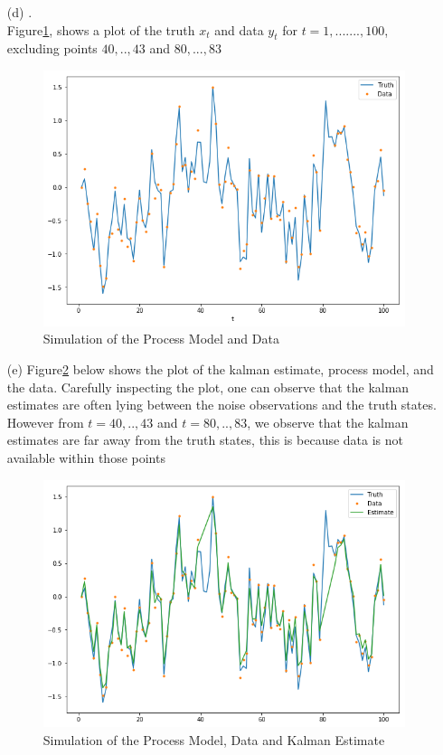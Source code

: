 \documentclass[12pt,a4paper]{article}
\begin{document}
\begin{itemize}
	\item [(d)].\\	
	Figure\ref{fig2}, shows a plot of the truth $x_{t}$ and data $y_{t}$ for $t=1,.......,100$, excluding points $40,..,43$ and $80,...,83$
	\begin{figure}[h!]
		\centering
		\includegraphics[scale=0.5]{b.png}
		\caption{Simulation of the Process Model and Data} \label{fig2}
	\end{figure}
\newpage
	\item [(e)]Figure\ref{fig3} below shows the plot of the kalman estimate, process model, and the data. Carefully inspecting the plot, one can observe that the kalman estimates are often lying between the noise observations and the truth states. However from $t=40,..,43$ and $t=80,..,83$, we observe that the kalman estimates are far away from the truth states, this is because data is not available within those points
	\begin{figure}[h!]
		\centering
		\includegraphics[scale=0.5]{c.png} 
		\caption{Simulation of the Process Model, Data and Kalman Estimate} \label{fig3}
	\end{figure}
\end{itemize}
\end{document}
